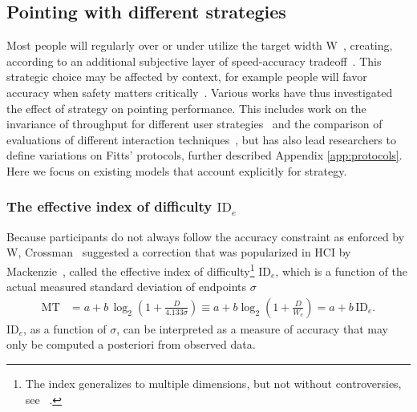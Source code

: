\documentclass[acmlarge, manuscript,review]{acmart}
\newcommand{\mt}{\ensuremath{{\text{MT}}}\xspace}
\newcommand{\ide}{\ensuremath{{\text{ID}_e}}\xspace}
\begin{document}
\subsection{Pointing with different strategies}
Most people will regularly over or under utilize the target width W~\cite{soukoreff2004}, creating, according to \citeauthor{zhai2004nominal} an additional subjective layer of speed-accuracy tradeoff~\cite{zhai2004nominal}. This strategic choice may be affected by context, for example people will favor accuracy when safety matters critically~\cite{guiard2011b}.
Various works have thus investigated the effect of strategy on pointing performance. This includes work on the invariance of throughput for different user strategies~\cite{mackenzie2008,olafsdottir2012,batmaz2022} and the comparison of evaluations of different interaction techniques~\cite{yamanaka2023}, but has also lead researchers to define variations on Fitts' protocols, further described Appendix \ref{app:protocols}. Here we focus on existing models that account explicitly for strategy.
\subsubsection{The effective index of difficulty \ide}
Because participants do not always follow the accuracy constraint as enforced by W, Crossman~\cite{crossman1957} suggested a correction that was popularized in HCI by Mackenzie~\cite{soukoreff2004, gori2018tochi}, called the effective index of difficulty\footnote{The index generalizes to multiple dimensions, but not without controversies, see \eg~\cite{wobbrock2011,mackenzie1992,gori2023}.}
\ide, which is a function of the actual measured standard deviation of endpoints $\sigma$
\begin{align}
  \mt & = a + b\,\log_2 \left(1 + \frac{D}{4.133\sigma}\right)                       \equiv a + b \log_2 \left(1 + \frac{D}{W_e}\right)= a + b\,\text{ID}_e        . \label{eq:ide}
\end{align}
ID$_e$, as a function of $\sigma$, can be interpreted as a measure of accuracy that may only be computed a posteriori from observed data.
\end{document}
